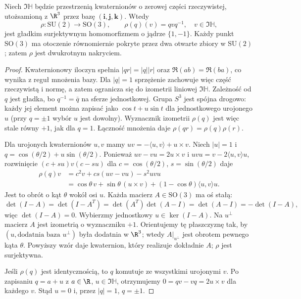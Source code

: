 \begin{twierdzenie}
\label{thm:su2-so3-cover-lie}
Niech $\Im\mathbb H$ będzie przestrzenią
kwaternionów o zerowej części rzeczywistej, utożsamioną
z $\R^3$ przez bazę $(\mathbf i,\mathbf j,\mathbf k)$.
Wtedy
\[
 \rho:\mathrm{SU}(2)\longrightarrow\mathrm{SO}(3),
 \qquad \rho(q)(v)=qvq^{-1},\quad
 v\in\Im\mathbb H,
\]
jest gładkim surjektywnym homomorfizmem o jądrze
$\{1,-1\}$. Każdy punkt $\mathrm{SO}(3)$ ma otoczenie
równomiernie pokryte przez dwa otwarte zbiory w
$\mathrm{SU}(2)$; zatem $\rho$ jest dwukrotnym nakryciem.
\end{twierdzenie}
\begin{proof}
Kwaternionowy iloczyn spełnia $|qr|=|q||r|$ oraz
$\Re(ab)=\Re(ba)$, co wynika z reguł mnożenia bazy.
Dla $|q|=1$ sprzężenie zachowuje więc część rzeczywistą
i normę, a zatem ogranicza się do izometrii liniowej
$\Im\mathbb H$. Zależność od $q$ jest
gładka, bo $q^{-1}=\bar q$ na sferze jednostkowej.
Grupa $S^3$ jest spójna drogowo: każdy jej element
można zapisać jako $\cos t+u\sin t$ dla jednostkowego
urojonego $u$ (przy $q=\pm1$ wybór $u$ jest dowolny).
Wyznacznik izometrii $\rho(q)$ jest więc stale równy
$+1$, jak dla $q=1$. Łączność mnożenia daje
$\rho(qr)=\rho(q)\rho(r)$.

Dla urojonych kwaternionów $u,v$ mamy
$uv=-\langle u,v\rangle+u\times v$.
Niech $|u|=1$ i
$q=\cos(\theta/2)+u\sin(\theta/2)$.
Ponieważ $uv-vu=2u\times v$ i
$uvu=v-2\langle u,v\rangle u$, rozwinięcie
$(c+su)v(c-su)$ dla
$c=\cos(\theta/2)$, $s=\sin(\theta/2)$ daje
\begin{align*}
 \rho(q)v
 &=c^2v+cs(uv-vu)-s^2uvu\\
 &=\cos\theta\,v+
   \sin\theta\,(u\times v)+
   (1-\cos\theta)\langle u,v\rangle u.
\end{align*}
Jest to obrót o kąt $\theta$ wokół osi $u$.
Każda macierz $A\in\mathrm{SO}(3)$ ma oś stałą:
\[
 \det(I-A)=\det(I-A^T)
 =\det(A^T)\det(A-I)
 =\det(A-I)=-\det(I-A),
\]
więc $\det(I-A)=0$. Wybierzmy jednostkowy
$u\in\ker(I-A)$. Na $u^\perp$ macierz $A$ jest
izometrią o wyznaczniku $+1$. Orientujemy tę płaszczyznę
tak, by $(u,\text{dodatnia baza }u^\perp)$ była dodatnia
w $\R^3$; wtedy $A|_{u^\perp}$ jest obrotem pewnego
kąta $\theta$. Powyższy wzór daje kwaternion,
który realizuje dokładnie $A$; $\rho$ jest surjektywna.

Jeśli $\rho(q)$ jest identycznością, to $q$ komutuje
ze wszystkimi urojonymi $v$. Po zapisaniu $q=a+u$
z $a\in\R$, $u\in\Im\mathbb H$,
otrzymujemy $0=qv-vq=2u\times v$ dla każdego $v$.
Stąd $u=0$ i, przez $|q|=1$, $q=\pm1$.


\end{proof}
